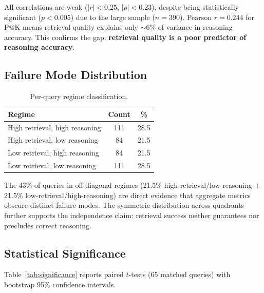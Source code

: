 \documentclass[11pt,a4paper]{article}
\begin{document}
All correlations are weak ($|r|{<}0.25$, $|\rho|{<}0.23$), despite
being statistically significant ($p{<}0.005$) due to the large
sample ($n{=}390$).
Pearson $r{=}0.244$ for P@K means retrieval quality explains only
$\sim$6\% of variance in reasoning accuracy.
This confirms the gap: \textbf{retrieval quality is a poor predictor
of reasoning accuracy}.

\subsection{Failure Mode Distribution}

\begin{table}[h]
\centering
\small
\caption{Per-query regime classification.}
\label{tab:failure-modes}
\begin{tabular}{lcc}
\toprule
\textbf{Regime} & \textbf{Count} & \textbf{\%} \\
\midrule
High retrieval, high reasoning           & 111 & 28.5 \\
High retrieval, low reasoning            & 84 & 21.5 \\
Low retrieval, high reasoning            & 84 & 21.5 \\
Low retrieval, low reasoning             & 111 & 28.5 \\
\bottomrule
\end{tabular}
\end{table}

The 43\% of queries in off-diagonal regimes (21.5\% high-retrieval/low-reasoning + 21.5\% low-retrieval/high-reasoning)
are direct evidence that aggregate metrics obscure distinct failure
modes.
The symmetric distribution across quadrants further supports the
independence claim: retrieval success neither guarantees nor
precludes correct reasoning.

\subsection{Statistical Significance}

Table~\ref{tab:significance} reports paired $t$-tests (65 matched
queries) with bootstrap 95\% confidence intervals.
\end{document}
